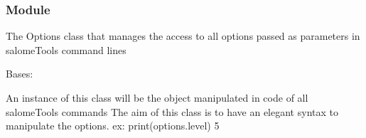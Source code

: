 \documentclass[a4paper,10pt,english]{sphinxmanual}
\begin{document}
\subsubsection{ Module}
\label{\detokenize{commands/apidoc/src:module-src.options}}\label{\detokenize{commands/apidoc/src:options-module}}
The Options class that manages the access to all options passed as 
parameters in salomeTools command lines

\begin{fulllineitems}
\label{\detokenize{commands/apidoc/src:src.options.OptResult}}
Bases: 

An instance of this class will be the object manipulated
in code of all salomeTools commands
The aim of this class is to have an elegant syntax 
to manipulate the options. 
ex: 
print(options.level)
5

\end{fulllineitems}

\end{document}
